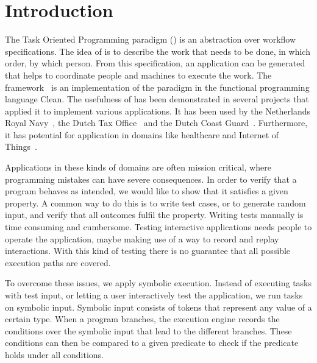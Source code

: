 
\section{Introduction}

The Task Oriented Programming paradigm (\TOP) is an abstraction over workflow specifications.
The idea of \TOP is to describe the work that needs to be done, in which order, by which person.
From this specification, an application can be generated that helps to coordinate people and machines to execute the work.
The \ITASKS framework~\cite{DBLP:conf/ppdp/PlasmeijerLMAK12} is an implementation of the paradigm in the functional programming language Clean.
The usefulness of \TOP has been demonstrated in several projects that applied it to implement various applications.
It has been used by the Netherlands Royal Navy~\cite{jansen2018dynamic}, the Dutch Tax Office~\cite{conf/sfp/StutterheimAP17} and the Dutch Coast Guard~\cite{lijnse2012incidone}. %
Furthermore, it has potential for application in domains like healthcare and Internet of Things~\cite{DBLP:conf/cgo/KoopmanLP18}.

Applications in these kinds of domains are often mission critical, where programming mistakes can have severe consequences.
In order to verify that a \TOPHAT program behaves as intended, we would like to show that it satisfies a given property.
A common way to do this is to write test cases, or to generate random input, and verify that all outcomes fulfil the property.
Writing tests manually is time consuming and cumbersome.
Testing interactive applications needs people to operate the application, maybe making use of a way to record and replay interactions.
With this kind of testing there is no guarantee that all possible execution paths are covered.

To overcome these issues, we apply symbolic execution.
Instead of executing tasks with test input, or letting a user interactively test the application,
we run tasks on symbolic input.
Symbolic input consists of tokens that represent any value of a certain type.
When a program branches, the execution engine records the conditions over the symbolic input that lead to the different branches.
These conditions can then be compared to a given predicate to check if the predicate holds under all conditions.


